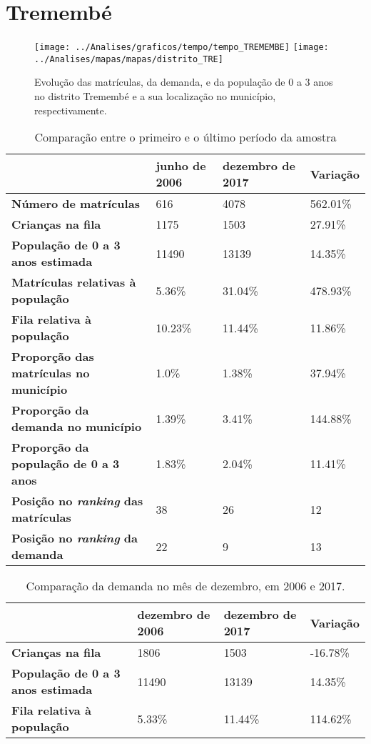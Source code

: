 \section{Tremembé}
\begin{figure}[H]
	\centering
	\texttt{[image: ../Analises/graficos/tempo/tempo\_TREMEMBE]}
	\texttt{[image: ../Analises/mapas/mapas/distrito\_TRE]}
	\caption{Evolução das matrículas, da demanda, e da população de 0 a 3 anos no distrito Tremembé e a sua localização no município, respectivamente.}
\end{figure}
\begin{table}[H]
	\begin{tabular}{|l|l|l|l|}
		\hline
		\textbf{}                                      & \textbf{junho de 2006}       & \textbf{dezembro de 2017}    & \textbf{Variação} \\ \hline
		\textbf{Número de matrículas}                  & 616 & 4078 & 562.01\% \\ \hline
		\textbf{Crianças na fila}                      & 1175 & 1503 & 27.91\% \\ \hline
		\textbf{População de 0 a 3 anos estimada}      & 11490 & 13139 & 14.35\% \\ \hline
		\textbf{Matrículas relativas à população}      & 5.36\% & 31.04\% & 478.93\% \\ \hline
		\textbf{Fila relativa à população}             & 10.23\% & 11.44\% & 11.86\% \\ \hline
		\textbf{Proporção das matrículas no município} & 1.0\% & 1.38\% & 37.94\% \\ \hline
		\textbf{Proporção da demanda no município}     & 1.39\% & 3.41\% & 144.88\% \\ \hline
		\textbf{Proporção da população de 0 a 3 anos}  & 1.83\% & 2.04\% & 11.41\% \\ \hline
		\textbf{Posição no \textit{ranking} das matrículas}     & 38 & 26 & 12 \\ \hline
		\textbf{Posição no \textit{ranking} da demanda}         & 22 & 9 & 13 \\ \hline
	\end{tabular}
	\caption{Comparação entre o primeiro e o último período da amostra}
\end{table}
\begin{table}[H]
	\begin{tabular}{|l|l|l|l|}
		\hline
		\textbf{}                                 & \textbf{dezembro de 2006} & \textbf{dezembro de 2017} & \textbf{Variação} \\ \hline
		\textbf{Crianças na fila}                      & 1806 & 1503 & -16.78\% \\ \hline
		\textbf{População de 0 a 3 anos estimada}      & 11490 & 13139 & 14.35\% \\ \hline
		\textbf{Fila relativa à população}             & 5.33\% & 11.44\% & 114.62\% \\ \hline
	\end{tabular}
	\caption{Comparação da demanda no mês de dezembro, em 2006 e 2017.}
\end{table}

